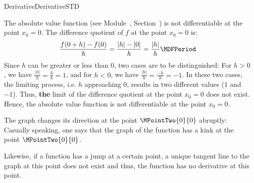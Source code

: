 \begin{MXContent}{Derivative}{Derivative}{STD}
\begin{MExample}
The absolute value function (see Module~, Section~)
is not differentiable at the point $x_0 = 0$. The difference quotient of $f$ at the point 
$x_0 = 0$ is:
\[
\frac{f(0+h) - f(0)}{h} = \frac{|h| - |0|}{h} = \frac{|h|}{h} \MDFPeriod
\]
Since $h$ can be greater or less than $0$, two cases are to be distinguished:
For $h > 0$, we have $\frac{|h|}{h} = \frac{h}{h} = 1$, and for $h < 0$, we 
have $\frac{|h|}{h} = \frac{-h}{h} = -1$. In these two cases, the limiting process, 
i.e. $h$ approaching $0$, results in two different values ($1$ and $-1$).
Thus, \textbf{the} limit of the difference quotient at the point $x_0 = 0$ does not exist. 
Hence, the absolute value function is not differentiable at the point $x_0 = 0$.

The graph changes its direction at the point $\MPointTwo{0}{0}$ abruptly: 
Casually speaking, one says that the graph of the function has a kink at the point $\MPointTwo{0}{0}$.
\begin{center}
\end{center}
\end{MExample}

Likewise, if a function has a jump at a certain point, a unique tangent line to the graph at 
this point does not exist and thus, the function has no derivative at this point.

\end{MXContent}

